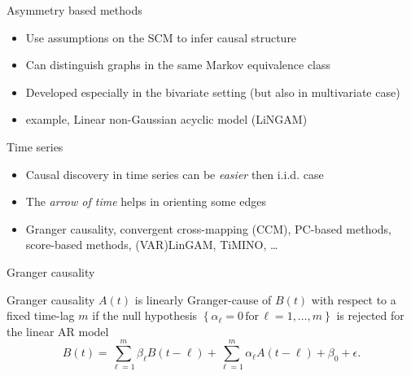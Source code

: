 \documentclass{beamer}
\begin{document}
\begin{frame}{Asymmetry based methods} 
	\begin{itemize}
		\item<1-> Use assumptions on the SCM to infer causal structure 
		\item<2-> Can distinguish graphs in the same Markov equivalence class 
		\item<3-> Developed especially in the bivariate setting (but also in multivariate case)
		\item<4-> example, Linear non-Gaussian acyclic model (LiNGAM)~\citep{shimizu2006linear} 
	\end{itemize}
\end{frame}


\begin{frame}{Time series}
\begin{itemize}
	\item Causal discovery in time series can be \emph{easier} then i.i.d. case 
	\item The \emph{arrow of time} helps in orienting some edges 
	\item<2-> Granger causality, convergent cross-mapping (CCM), PC-based methods, 
		score-based methods, (VAR)LinGAM, TiMINO, \ldots 
\end{itemize}
\end{frame}


\begin{frame}{Granger causality} 
\begin{block}{Granger causality}
$A(t)$ is linearly Granger-cause of $B(t)$ with 
respect to a fixed time-lag $m$ 
if the null hypothesis 
$\left\{ \alpha_\ell=0 \,\text{for}\, \ell = 1,\ldots,m \right\}$ 
is rejected for the linear AR model 
		\[B(t) = \sum_{\ell=1}^m \beta_\ell B(t-\ell) + \sum_{\ell=1}^m \alpha_\ell A(t-\ell) + \beta_0 + \epsilon.\]
	\end{block}
\end{frame}


\begin{frame}[allowframebreaks]

\end{frame}
\end{document}
